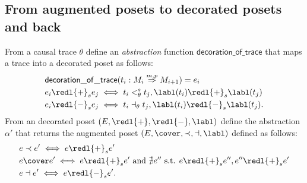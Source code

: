 \subsection{From augmented posets to decorated posets and back}
\label{sec:abstract_decoration}

\begin{definition}[Abstractions]
  From a causal trace $\theta$ define an \emph{abstraction} function $\mathsf{decoration\_of\_trace}$ that maps a trace into a decorated poset as follows:
  \begin{align*}
    &\mathsf{decoration\_of\_trace}(t_i:M_i\overset{m,p}{\Rightarrow} M_{i+1}) = e_i \\
    &e_i \redl{+}_s e_j \iff t_i <_{\theta}^s t_j, \labl(t_i)\redl{+}_s \labl(t_j)\\
    &e_i \redl{-}_s e_j \iff t_i \dashv_{\theta} t_j, \labl(t_i) \redl{-}_s \labl(t_j).
  \end{align*}
  From an decorated poset $(E,\redl{+},\redl{-},\labl)$ define the abstraction $\alpha'$ that returns the augmented poset $(E,\cover,\prec,\dashv,\labl)$ defined as follows:
  \begin{align*}
    &e\prec e'\iff e\redl{+}_s e'\\
    &e\cover e'\iff e\redl{+}_s e'\text{ and }\nexists e''\text{ s.t. }e\redl{+}_s e'', e''\redl{+}_s e'\\
    &e\dashv e'\iff e\redl{-}_s e'.
  \end{align*}
\end{definition}
